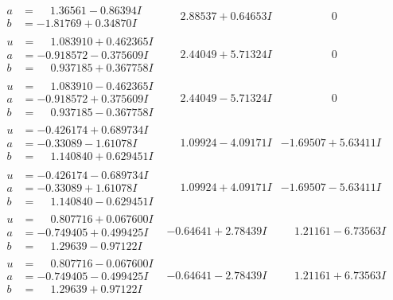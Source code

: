 \documentclass[1p]{elsarticle_modified}
\theoremstyle{definition}
\begin{document}
$$\begin{array}{c|c|c}
\begin{aligned}
a &= \phantom{-}1.36561 - 0.86394 I \\
b &= -1.81769 + 0.34870 I\end{aligned}
 & \phantom{-}2.88537 + 0.64653 I & \phantom{-0.000000 } 0 \\ \hline\begin{aligned}
u &= \phantom{-}1.083910 + 0.462365 I \\
a &= -0.918572 - 0.375609 I \\
b &= \phantom{-}0.937185 + 0.367758 I\end{aligned}
 & \phantom{-}2.44049 + 5.71324 I & \phantom{-0.000000 } 0 \\ \hline\begin{aligned}
u &= \phantom{-}1.083910 - 0.462365 I \\
a &= -0.918572 + 0.375609 I \\
b &= \phantom{-}0.937185 - 0.367758 I\end{aligned}
 & \phantom{-}2.44049 - 5.71324 I & \phantom{-0.000000 } 0 \\ \hline\begin{aligned}
u &= -0.426174 + 0.689734 I \\
a &= -0.33089 - 1.61078 I \\
b &= \phantom{-}1.140840 + 0.629451 I\end{aligned}
 & \phantom{-}1.09924 - 4.09171 I & -1.69507 + 5.63411 I \\ \hline\begin{aligned}
u &= -0.426174 - 0.689734 I \\
a &= -0.33089 + 1.61078 I \\
b &= \phantom{-}1.140840 - 0.629451 I\end{aligned}
 & \phantom{-}1.09924 + 4.09171 I & -1.69507 - 5.63411 I \\ \hline\begin{aligned}
u &= \phantom{-}0.807716 + 0.067600 I \\
a &= -0.749405 + 0.499425 I \\
b &= \phantom{-}1.29639 - 0.97122 I\end{aligned}
 & -0.64641 + 2.78439 I & \phantom{-}1.21161 - 6.73563 I \\ \hline\begin{aligned}
u &= \phantom{-}0.807716 - 0.067600 I \\
a &= -0.749405 - 0.499425 I \\
b &= \phantom{-}1.29639 + 0.97122 I\end{aligned}
 & -0.64641 - 2.78439 I & \phantom{-}1.21161 + 6.73563 I\\

\end{array}$$
\end{document}
